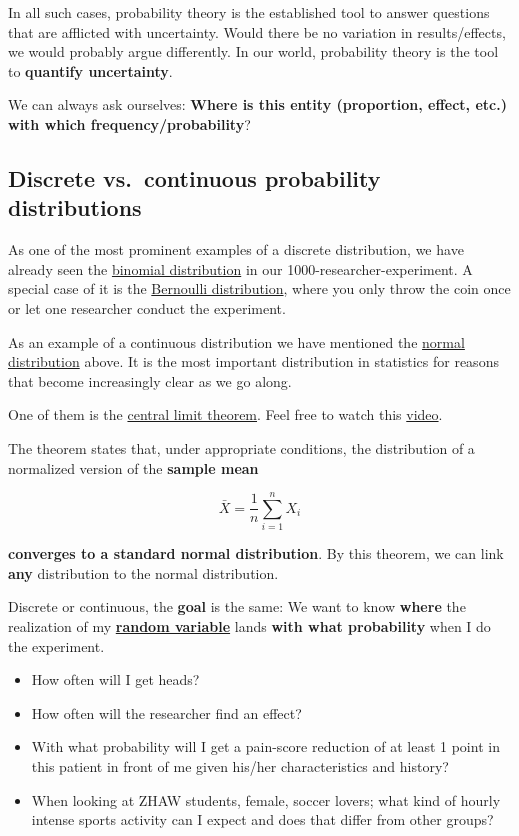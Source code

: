 \documentclass[
]{book}
\begin{document}
In all such cases, probability theory is the established tool to answer questions that are afflicted with uncertainty. Would there be no variation in results/effects,
we would probably argue differently. In our world, probability theory is the tool to \textbf{quantify uncertainty}.

We can always ask ourselves: \textbf{Where is this entity (proportion, effect, etc.) with which frequency/probability}?

\subsection{Discrete vs.~continuous probability distributions}\label{discrete_vs_continuous_probability_distributions}

As one of the most prominent examples of a discrete distribution, we have already seen
the \href{https://en.wikipedia.org/wiki/Binomial_distribution}{binomial distribution} in our 1000-researcher-experiment.
A special case of it is the \href{https://en.wikipedia.org/wiki/Bernoulli_distribution}{Bernoulli distribution},
where you only throw the coin once or let one researcher conduct the experiment.

As an example of a continuous distribution we have mentioned the \href{https://en.wikipedia.org/wiki/Normal_distribution}{normal distribution} above.
It is the most important distribution in statistics for reasons that become increasingly clear as we go along.

One of them is the \href{https://en.wikipedia.org/wiki/Central_limit_theorem}{central limit theorem}.
Feel free to watch this \href{https://www.youtube.com/watch?v=zeJD6dqJ5lo&t=28s&ab_channel=3Blue1Brown}{video}.

The theorem states that, under appropriate conditions, the distribution of a normalized version of the \textbf{sample
mean}

\[\bar{X} = \frac{1}{n}\sum_{i=1}^{n} X_i\]

\textbf{converges to a standard normal distribution}.
By this theorem, we can link \textbf{any} distribution to the normal distribution.

Discrete or continuous, the \textbf{goal} is the same: We want to know \textbf{where} the realization
of my \textbf{\href{https://www.youtube.com/watch?v=Y9nsL69CwbU&t=18s&ab_channel=VeryNormal}{random variable}}
lands \textbf{with what probability} when I do the experiment.

\begin{itemize}
\item
  How often will I get heads?
\item
  How often will the researcher find an effect?
\item
  With what probability will I get a pain-score reduction of at least 1 point in this patient in front of me given his/her
  characteristics and history?
\item
  When looking at ZHAW students, female, soccer lovers; what kind of hourly intense sports activity
  can I expect and does that differ from other groups?
\end{itemize}
\end{document}
